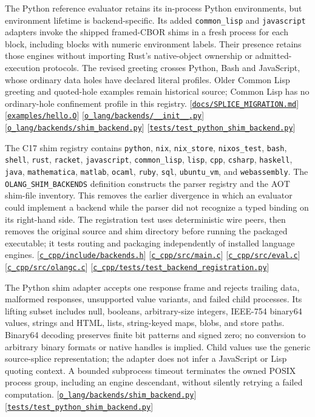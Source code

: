 \documentclass[11pt,oneside]{article}
\newcommand{\src}[1]{\textcolor{OSlate}{\scriptsize[\href{https://github.com/lostadi/OSTADIX/blob/c0b02c326b2329a95ba52447c7180bc93957cd57/#1}{\nolinkurl{#1}}]}\allowbreak}
\begin{document}
The Python reference evaluator retains its in-process Python environments,
but environment lifetime is backend-specific. Its added
\texttt{common\_lisp} and \texttt{javascript} adapters invoke the shipped
framed-CBOR shims in a fresh process for each block, including blocks with
numeric environment labels. Their presence retains those engines without importing Rust's native-object
ownership or admitted-execution protocols. The revised greeting crosses Python,
Bash and JavaScript, whose ordinary data holes have declared literal profiles.
Older Common Lisp greeting and quoted-hole examples remain historical source;
Common Lisp has no ordinary-hole confinement profile in this registry.
\src{docs/SPLICE_MIGRATION.md}
\src{examples/hello.O}
\src{o_lang/backends/__init__.py}
\src{o_lang/backends/shim_backend.py}
\src{tests/test_python_shim_backend.py}

The C17 shim registry contains \texttt{python}, \texttt{nix},
\texttt{nix\_store}, \texttt{nixos\_test}, \texttt{bash},
\texttt{shell}, \texttt{rust}, \texttt{racket}, \texttt{javascript},
\texttt{common\_lisp}, \texttt{lisp}, \texttt{cpp}, \texttt{csharp},
\texttt{haskell}, \texttt{java}, \texttt{mathematica}, \texttt{matlab},
\texttt{ocaml}, \texttt{ruby}, \texttt{sql}, \texttt{ubuntu\_vm}, and
\texttt{webassembly}. The \texttt{OLANG\_SHIM\_BACKENDS} definition
constructs the parser registry and the AOT shim-file inventory. This removes
the earlier divergence in which an evaluator could implement a backend while
the parser did not recognize a typed binding on its right-hand side. The
registration test uses deterministic wire peers, then removes the original
source and shim directory before running the packaged executable; it tests
routing and packaging independently of installed language engines.
\src{c_cpp/include/backends.h}
\src{c_cpp/src/main.c}
\src{c_cpp/src/eval.c}
\src{c_cpp/src/olangc.c}
\src{c_cpp/tests/test_backend_registration.py}

The Python shim adapter accepts one response frame and rejects trailing data,
malformed responses, unsupported value variants, and failed child processes.
Its lifting subset includes null, booleans, arbitrary-size integers,
IEEE-754 binary64 values, strings and HTML, lists, string-keyed maps, blobs,
and store paths. Binary64 decoding preserves finite bit patterns and signed
zero; no conversion to arbitrary binary formats or native handles is implied.
Child values use the generic source-splice representation; the adapter does
not infer a JavaScript or Lisp quoting context. A bounded subprocess timeout
terminates the owned POSIX process group, including an engine descendant,
without silently retrying a failed computation.
\src{o_lang/backends/shim_backend.py}
\src{tests/test_python_shim_backend.py}
\end{document}
